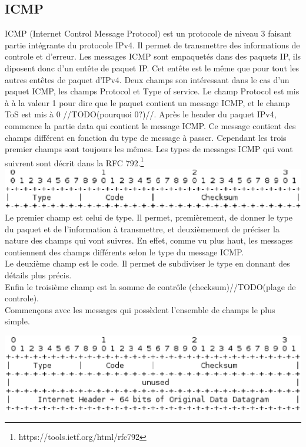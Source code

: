 \documentclass[twoside,openright,a4paper,11pt,french]{article}
\begin{document}
\subsection{ICMP}
ICMP (Internet Control Message Protocol) est un protocole de niveau 3 faisant partie intégrante du protocole IPv4. Il permet de transmettre des informations de controle et d'erreur. Les messages ICMP sont empaquetés dans des paquets IP, ils diposent donc d'un entête de paquet IP. Cet entête est le même que pour tout les autres entêtes de paquet d'IPv4. Deux champs son intéressant dans le cas d'un paquet ICMP, les champs Protocol et Type of service. Le champ Protocol est mis à à la valeur 1 pour dire que le paquet contient un message ICMP, et le champ ToS est mis à 0 //TODO(pourquoi 0?)//.
Après le header du paquet IPv4, commence la partie data qui contient le message ICMP. Ce message contient des champs différent en fonction du type de message à passer. Cependant les trois premier champs sont toujours les mêmes.
Les types de messages ICMP qui vont suivrent sont décrit dans la RFC 792.\footnote{https://tools.ietf.org/html/rfc792}
\\
\includegraphics[width=15cm]{./pics/header.eps}
\\Le premier champ est celui de type. Il permet, premièrement, de donner le type du paquet et de l'information à transmettre, et deuxièmement de préciser la nature des champs qui vont suivres. En effet, comme vu plus haut, les messages contiennent des champs différents selon le type du message ICMP.
\\Le deuxième champ est le code. Il permet de subdiviser le type en donnant des détails plus précis.
\\Enfin le troisième champ est la somme de contrôle (checksum)//TODO(plage de controle).
\\Commençons avec les messages qui possèdent l'ensemble de champs le plus simple.

\includegraphics[width=15cm]{./pics/header1.eps}
\end{document}
